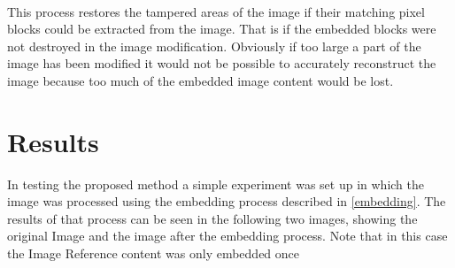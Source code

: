 \documentclass[12pt]{article}
\begin{document}
\hspace{0pt} \\
This process restores the tampered areas of the image if their matching pixel blocks could be extracted from the image. That is if the embedded blocks were not destroyed in the image modification. Obviously if too large a part of the image has been modified it would not be possible to accurately reconstruct the image because too much of the embedded image content would be lost.

\section{Results} 
In testing the proposed method a simple experiment was set up in which the image was processed using the embedding process described in \ref{embedding}.
The results of that process can be seen in the following two images, showing the original Image and the image after the embedding process.
Note that in this case the Image Reference content was only embedded once
\end{document}
